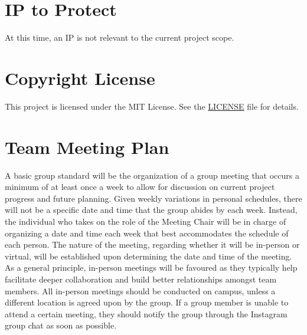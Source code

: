 \documentclass{article}
\begin{document}
\iffalse
\wss{For most teams this section will just state that there is no confidential
information to protect.}
\fi
\section{IP to Protect}

\iffalse
\wss{State whether there is IP to protect.  If there is, point to the agreement.
All students who are working on a project that requires an IP agreement are also
required to sign the ``Intellectual Property Guide Acknowledgement.''}
\fi

At this time, an IP is not relevant to the current project scope.

\section{Copyright License}

\iffalse
\wss{What copyright license is your team adopting.  Point to the license in your
repo.}
\fi

This project is licensed under the MIT License. See the \href{./LICENSE}{LICENSE} file for details.

\section{Team Meeting Plan}

\iffalse
\wss{How often will you meet? where?}

\wss{If the meeting is a physical location (not virtual), out of an abundance of
caution for safety reasons you shouldn't put the location online}

\wss{How often will you meet with your industry advisor?  when?  where?}

\wss{Will meetings be virtual?  At least some meetings should likely be
in-person.}

\wss{How will the meetings be structured?  There should be a chair for all meetings.  There should be an agenda for all meetings.}
\fi

A basic group standard will be the organization of a group meeting that occurs a minimum of at least once a week to
allow for discussion on current project progress and future planning. Given weekly variations in personal schedules, there
will not be a specific date and time that the group abides by each week. Instead, the individual who takes on the
role of the Meeting Chair will be in charge of organizing a date and time each week that best accommodates the
schedule of each person. The nature of the meeting, regarding whether it will be in-person or virtual, will be
established upon determining the date and time of the meeting. As a general principle, in-person meetings will be
favoured as they typically help facilitate deeper collaboration and build better relationships amongst team
members. All in-person meetings should be conducted on campus, unless a different location is agreed upon by the
group. If a group member is unable to attend a certain meeting, they should notify the group through the Instagram
group chat as soon as possible.\\
\end{document}
